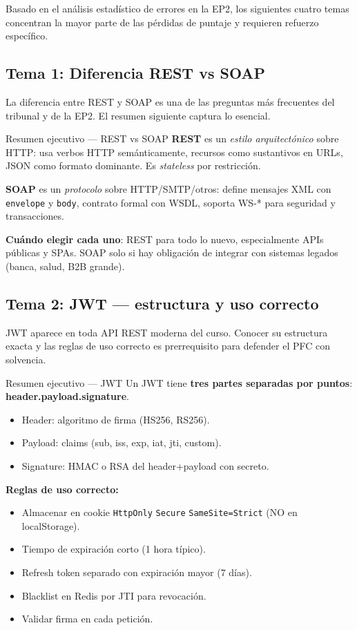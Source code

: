 \documentclass[11pt,a4paper,openany]{book}
\begin{document}
Basado en el análisis estadístico de errores en la EP2, los siguientes
cuatro temas concentran la mayor parte de las pérdidas de puntaje y
requieren refuerzo específico.

\subsection{Tema 1: Diferencia REST vs SOAP}

La diferencia entre REST y SOAP es una de las preguntas más
frecuentes del tribunal y de la EP2. El resumen siguiente captura lo
esencial.


\begin{cajadefinicion}{Resumen ejecutivo --- REST vs SOAP}
\textbf{REST} es un \emph{estilo arquitectónico} sobre HTTP: usa
verbos HTTP semánticamente, recursos como sustantivos en URLs, JSON
como formato dominante. Es \emph{stateless} por restricción.

\textbf{SOAP} es un \emph{protocolo} sobre HTTP/SMTP/otros: define
mensajes XML con \texttt{envelope} y \texttt{body}, contrato formal
con WSDL, soporta WS-* para seguridad y transacciones.

\textbf{Cuándo elegir cada uno}: REST para todo lo nuevo, especialmente
APIs públicas y SPAs. SOAP solo si hay obligación de integrar con
sistemas legados (banca, salud, B2B grande).
\end{cajadefinicion}

\subsection{Tema 2: JWT --- estructura y uso correcto}

JWT aparece en toda API REST moderna del curso. Conocer su
estructura exacta y las reglas de uso correcto es prerrequisito para
defender el PFC con solvencia.


\begin{cajadefinicion}{Resumen ejecutivo --- JWT}
Un JWT tiene \textbf{tres partes separadas por puntos}:
\textbf{header.payload.signature}.

\begin{itemize}
\item Header: algoritmo de firma (HS256, RS256).
\item Payload: claims (sub, iss, exp, iat, jti, custom).
\item Signature: HMAC o RSA del header+payload con secreto.
\end{itemize}

\textbf{Reglas de uso correcto:}
\begin{itemize}
\item Almacenar en cookie \texttt{HttpOnly} \texttt{Secure}
\texttt{SameSite=Strict} (NO en localStorage).
\item Tiempo de expiración corto (1 hora típico).
\item Refresh token separado con expiración mayor (7 días).
\item Blacklist en Redis por JTI para revocación.
\item Validar firma en cada petición.
\end{itemize}
\end{cajadefinicion}
\end{document}
